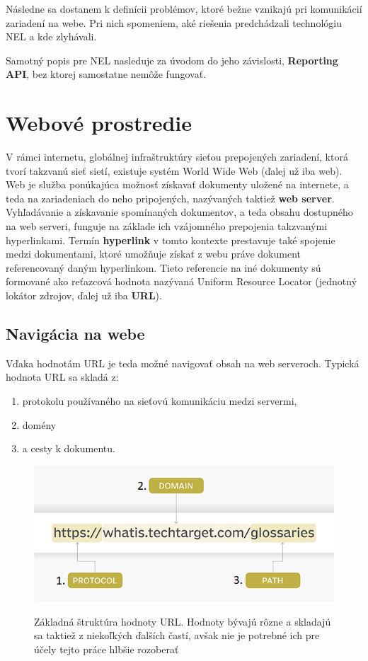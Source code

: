 Následne sa dostanem k definícii problémov, ktoré bežne vznikajú pri komunikácií
zariadení na webe.
Pri nich spomeniem, aké riešenia predchádzali technológiu NEL a kde zlyhávali.

Samotný popis pre NEL nasleduje za úvodom do jeho závislosti, \textbf{Reporting API}, bez ktorej samostatne nemôže fungovať.

\section{Webové prostredie}

V rámci internetu, globálnej infraštruktúry sieťou prepojených zariadení, ktorá tvorí takzvanú sieť sietí, existuje systém World Wide Web (ďalej už iba web).
Web je služba ponúkajúca možnosť získavať dokumenty uložené na internete, a teda na zariadeniach do neho pripojených, nazývaných taktiež \textbf{web server}. 
Vyhľadávanie a získavanie spomínaných dokumentov, a teda obsahu dostupného na web serveri, funguje na základe ich vzájomného prepojenia takzvanými hyperlinkami.
Termín \textbf{hyperlink} v tomto kontexte prestavuje také spojenie medzi 
dokumentami, ktoré umožňuje získať z webu práve dokument referencovaný daným hyperlinkom.
Tieto referencie na iné dokumenty sú formované ako reťazcová hodnota nazývaná Uniform Resource Locator (jednotný lokátor zdrojov, ďalej už iba \textbf{URL}).

\pagebreak

\subsection{Navigácia na webe}

Vďaka hodnotám URL je teda možné navigovať obsah na web serveroch.
Typická hodnota URL sa skladá z:
\begin{enumerate}
    \item protokolu používaného na sieťovú komunikáciu medzi servermi,
    \item domény
    \item a cesty k dokumentu.
\end{enumerate}

\begin{figure}[htb]
\begin{center}
 \includegraphics[scale=0.6]{obrazky-figures/the-anatomy-of-a-url.png}\label{fig:figure1}
 \caption{Základná štruktúra hodnoty URL. Hodnoty bývajú rôzne a skladajú sa taktiež z niekoľkých ďalších častí, avšak nie je potrebné ich pre účely tejto práce hlbšie rozoberať}
 \label{img:urlstructure}
\end{center}
\end{figure}

